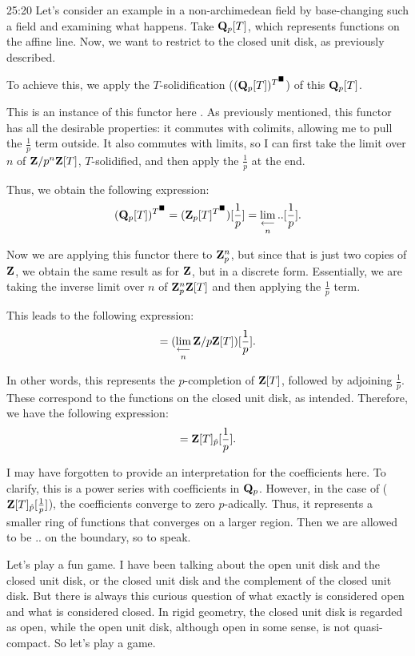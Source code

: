\begin{unfinished}{25:20}
\bex
Let's consider an example in a non-archimedean field by base-changing such a field and examining what happens. Take $\mathbf Q_p[T]$, which represents functions on the affine line. Now, we want to restrict to the closed unit disk, as previously described. 

To achieve this, we apply the $T$-solidification ($(\mathbf Q_p[T])^{T^\blacksquare}$) of this $\mathbf Q_p[T]$.

This is an instance of this functor here . As previously mentioned, this functor has all the desirable properties: it commutes with colimits, allowing me to pull the $\frac{1}{p}$ term outside. It also commutes with limits, so I can first take the limit over $n$ of $\mathbf Z/p^n\mathbf Z[T]$, $T$-solidified, and then apply the $\frac{1}{p}$ at the end.

Thus, we obtain the following expression:
\begin{align*}
(\mathbf Q_p[T])^{T^\blacksquare} = (\mathbf Z_p[T]^{T^\blacksquare})[\frac{1}{p}] = \mathop{\operatorname*{lim}\limits_{\longleftarrow}}\limits_n .. [\frac{1}{p}].
\end{align*}

Now we are applying this functor there to $\mathbf Z_p^n$, but since that is just two copies of $\mathbf Z$, we obtain the same result as for $\mathbf Z$, but in a discrete form. Essentially, we are taking the inverse limit over $n$ of $\mathbf Z_p^n\mathbf Z[T]$ and then applying the $\frac{1}{p}$ term.

This leads to the following expression:
\begin{align*}
= (\mathop{\operatorname*{lim}\limits_{\longleftarrow}}\limits_n \mathbf Z / p \mathbf Z [T])[\frac{1}{p}].
\end{align*}

In other words, this represents the $p$-completion of $\mathbf Z[T]$, followed by adjoining $\frac{1}{p}$. These correspond to the functions on the closed unit disk, as intended. Therefore, we have the following expression:
\begin{align*}
= \mathbf Z[T]_{\hat{p}}[\frac{1}{p}].
\end{align*}

\eex

I may have forgotten to provide an interpretation for the coefficients here.
To clarify, this is a power series with coefficients in $\mathbf Q_p$. However, in the case of ($\mathbf Z[T]_{\hat{p}} [\frac{1}{p}]$), the coefficients converge to zero $p$-adically. 
Thus, it represents a smaller ring of functions that converges on a larger region. Then we are allowed to be ..  on the boundary, so to speak.

Let's play a fun game. I have been talking about the open unit disk and the closed unit disk, or the closed unit disk and the complement of the closed unit disk. 
But there is always this curious question of what exactly is considered open and what is considered closed. In rigid geometry, the closed unit disk is regarded as open, while the open unit disk, although open in some sense, is not quasi-compact.
So let's play a game. 


\end{unfinished}
